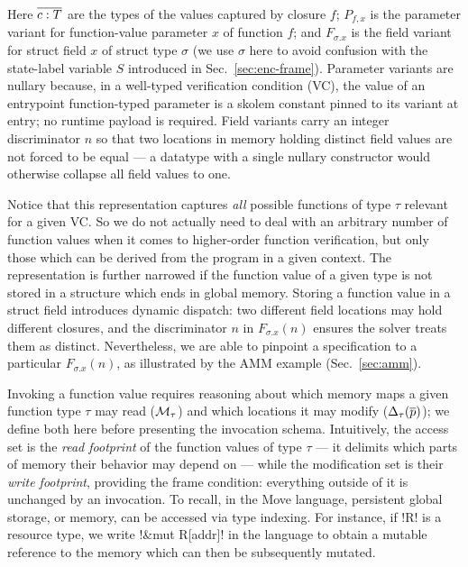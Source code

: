 \noindent Here $\overline{c:T}$ are the types of the values captured by closure $f$; $P_{f,x}$ is the parameter variant for function-value parameter $x$ of function $f$; and $F_{\sigma.x}$ is the field variant for struct field $x$ of struct type $\sigma$ (we use $\sigma$ here to avoid confusion with the state-label variable $S$ introduced in Sec.~\ref{sec:enc-frame}).
Parameter variants are nullary because, in a well-typed verification condition (VC), the value of an entrypoint function-typed parameter is a skolem constant pinned to its variant at entry; no runtime payload is required.
Field variants carry an integer discriminator $n$ so that two locations in memory holding distinct field values are not forced to be equal --- a datatype with a single nullary constructor would otherwise collapse all field values to one.

Notice that this representation captures \emph{all} possible functions of type $\tau$ relevant for a given VC.
So we do not actually need to deal with an arbitrary number of function values when it comes to higher-order function verification, but only those which can be derived from the program in a given context.
The representation is further narrowed if the function value of a given type is not stored in a structure which ends in global memory.
Storing a function value in a struct field introduces dynamic dispatch: two different field locations may hold different closures, and the discriminator $n$ in $F_{\sigma.x}(n)$ ensures the solver treats them as distinct.
Nevertheless, we are able to pinpoint a specification to a particular $F_{\sigma.x}(n)$, as illustrated by the AMM example (Sec.~\ref{sec:amm}).


\label{sec:enc-mem}

Invoking a function value requires reasoning about which memory maps a given function type $\tau$ may read ($\mathcal{M}_\tau$) and which locations it may modify ($\Delta_\tau(\overline{p})$); we define both here before presenting the invocation schema.
Intuitively, the access set is the \emph{read footprint} of the function values of type $\tau$ --- it delimits which parts of memory their behavior may depend on --- while the modification set is their \emph{write footprint}, providing the frame condition: everything outside of it is unchanged by an invocation.
To recall, in the Move language, persistent global storage, or memory, can be accessed via type indexing.
For instance, if !R! is a resource type, we write !&mut R[addr]! in the language to obtain a mutable reference to the memory which can then be subsequently mutated.


